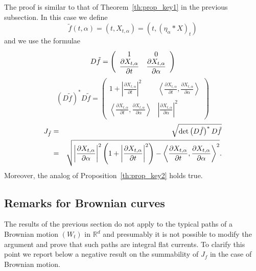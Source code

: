\documentclass{article}
\begin{document}
The proof is similar to that of Theorem~\ref{th:prop_key1} in the
previous subsection.  In this case we
define 
\begin{equation*}
\tilde{f}(t,\alpha )=\left( t,X_{t,\alpha }\right) =\left( t,\left( \eta
_{\alpha }\ast X\right) _{t}\right)
\end{equation*}
and we use the formulae 
\begin{equation*}
D\tilde{f}=\left( 
\begin{array}{cc}
\displaystyle 1 & \displaystyle 0 \\ 
\displaystyle\frac{\partial X_{t,\alpha }}{\partial t} & \displaystyle\frac{\partial X_{t,\alpha }}{%
\partial \alpha }
\end{array}
\right)
\end{equation*}
\begin{equation*}
\left( D\tilde{f}\right) ^{\ast }D\tilde{f}=\left( 
\begin{array}{cc}
\displaystyle1+\left| \frac{\partial X_{t,\alpha }}{\partial t}\right| ^{2} &\displaystyle 
\left\langle \frac{\partial X_{t,\alpha }}{\partial t},\frac{\partial
X_{t,\alpha }}{\partial \alpha }\right\rangle \\ 
\displaystyle
\left\langle \frac{\partial X_{t,\alpha }}{\partial t},\frac{\partial
X_{t,\alpha }}{\partial \alpha }\right\rangle & \displaystyle\left| \frac{\partial
X_{t,\alpha }}{\partial \alpha }\right| ^{2}
\end{array}
\right)
\end{equation*}
\begin{eqnarray*}
J_{\tilde{f}} &=&\sqrt{\det \left( D\tilde{f}\right) ^{\ast }D\tilde{f}} \\
&=&\sqrt{\left| \frac{\partial X_{t,\alpha }}{\partial \alpha }\right|
^{2}\left( 1+\left| \frac{\partial X_{t,\alpha }}{\partial t}\right|
^{2}\right) -\left\langle \frac{\partial X_{t,\alpha }}{\partial t},\frac{%
\partial X_{t,\alpha }}{\partial \alpha }\right\rangle ^{2}}.
\end{eqnarray*}
Moreover, the analog of Proposition~\ref{th:prop_key2} holds true.

\subsection{Remarks for Brownian curves}
The results of the previous section do not apply to the typical paths of a
Brownian motion $\left( W_{t}\right) $ in $\mathbb{R}^{d}$
  and presumably
 it is not possible to modify the argument and prove that such paths are
 integral flat currents. 
To clarify this point we report below a negative result on the
summability of  $J_{f}$ in the case of Brownian motion. 
\end{document}
